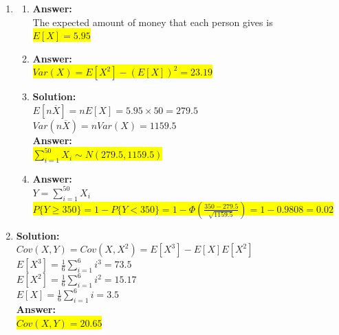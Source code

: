 \documentclass{article}
\newcommand{\myansw}{\textbf{Answer:}\\}
\newcommand{\mysolu}{\textbf{Solution:}\\}
\begin{document}
\begin{enumerate}
\begin{enumerate}
		
		
	\end{enumerate}
	\item
	\begin{enumerate}
	\item
		\myansw
		The expected amount of money that each person gives is\\
		\colorbox{yellow}{${E[X] = 5.95}$}\\
		\item
		\myansw
		\colorbox{yellow}{${Var(X) = E[X^2]-(E[X])^2 = 23.19}$}\\
		\item
		\mysolu
		${E[n\overline{X}]= nE[X]= 5.95 \times 50 =279.5}$\\
		${Var(n\overline{X}) = nVar(X)=1159.5}$\\
		\myansw
		\colorbox{yellow}{${\sum\limits_{i = 1}^{50}X_i \sim N(279.5, 1159.5)}$}\\		
		\item
		\myansw
		${Y = \sum\limits_{i = 1}^{50}X_i}$\\
		\colorbox{yellow}{${P\{Y \geq 350\} = 1 - P\{Y < 350\} = 1 - \Phi(\frac{350 - 279.5}{\sqrt{1159.5}}) = 1 - 0.9808  = 0.02}$}
		

	\end{enumerate}
	\item
	\mysolu 
	${Cov(X,Y) = Cov(X,X^2) = E[X^3] - E[X]E[X^2]}$\\
	$E[X^3] = \frac{1}{6}\sum\limits_{i = 1}^{6}i^3 = 73.5$\\
	$E[X^2] = \frac{1}{6}\sum\limits_{i = 1}^{6}i^2 = 15.17$\\
	$E[X] =\frac{1}{6}\sum\limits_{i = 1}^{6}i = 3.5 $\\
	\myansw
	\colorbox{yellow}{${Cov(X,Y) = 20.65}$}\\
	

\end{enumerate}
\end{document}
